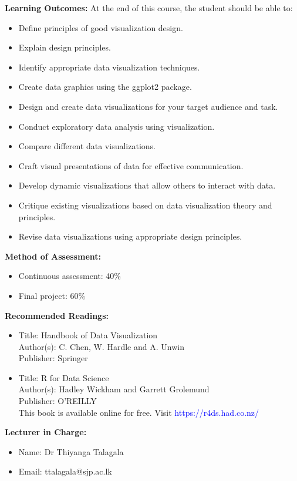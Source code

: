 \documentclass[a4paper,12pt]{article}
\begin{document}
\newpage

\noindent\textbf{Learning Outcomes:}
At the end of this course, the student should be able to:
\begin{itemize}
	\setlength\itemsep{0.1mm}
\item Define principles of good visualization design.
\item Explain design principles.
\item Identify appropriate data visualization techniques.
\item Create data graphics using the ggplot2 package.
\item Design and create data visualizations for your target audience and task.
\item Conduct exploratory data analysis using visualization.
\item Compare different data visualizations.
\item Craft visual presentations of data for effective communication.
\item Develop dynamic visualizations that allow others to interact with data.
\item Critique existing visualizations based on data visualization theory and principles.
\item Revise data visualizations using appropriate design principles.


\end{itemize}

\noindent\textbf{Method of Assessment:}
\begin{itemize}
	\setlength\itemsep{0.1mm}
	\item Continuous assessment: 40\%
	\item Final project: 60\%
\end{itemize}

\noindent\textbf{Recommended Readings:}
\begin{itemize}
	\setlength\itemsep{0.1mm}
	\item Title: Handbook of Data Visualization \\
		  Author(s): C. Chen, W. Hardle and A. Unwin \\
		  Publisher: Springer \\
	\item Title: R for Data Science \\
		  Author(s): Hadley Wickham and Garrett Grolemund \\
		  Publisher: O'REILLY \\
		  This book is available online for free. Visit \textcolor{blue}{https://r4ds.had.co.nz/}
\end{itemize}

\noindent\textbf{Lecturer in Charge:}

\begin{itemize}
	\setlength\itemsep{0.1mm}
	\item[] Name: Dr Thiyanga  Talagala
	\item[] Email: ttalagala@sjp.ac.lk
\end{itemize}
\end{document}
